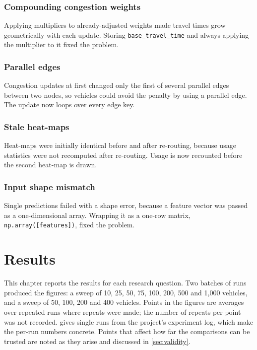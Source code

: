 \documentclass[12pt]{report}
\newcommand{\code}[1]{\texttt{#1}}
\begin{document}
\subsection{Compounding congestion weights}
Applying multipliers to already-adjusted weights made travel times grow geometrically with each update. Storing \code{base\_travel\_time} and always applying the multiplier to it fixed the problem.

\subsection{Parallel edges}
Congestion updates at first changed only the first of several parallel edges between two nodes, so vehicles could avoid the penalty by using a parallel edge. The update now loops over every edge key.

\subsection{Stale heat-maps}
Heat-maps were initially identical before and after re-routing, because usage statistics were not recomputed after re-routing. Usage is now recounted before the second heat-map is drawn.

\subsection{Input shape mismatch}
Single predictions failed with a shape error, because a feature vector was passed as a one-dimensional array. Wrapping it as a one-row matrix, \code{np.array([features])}, fixed the problem.


\chapter{Results}
\label{ch:results}

This chapter reports the results for each research question. Two batches of runs produced the figures: a sweep of 10, 25, 50, 75, 100, 200, 500 and 1,000 vehicles, and a sweep of 50, 100, 200 and 400 vehicles. Points in the figures are averages over repeated runs where repeats were made; the number of repeats per point was not recorded.  gives single runs from the project's experiment log, which make the per-run numbers concrete. Points that affect how far the comparisons can be trusted are noted as they arise and discussed in \cref{sec:validity}.
\end{document}

